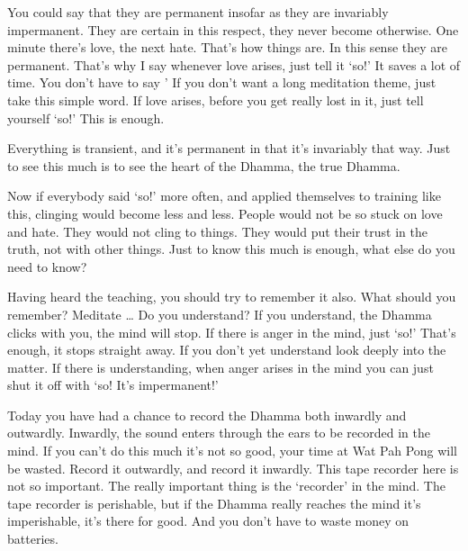 You could say that they are permanent insofar as they are invariably impermanent. They are certain in this respect, they never become otherwise. One minute there's love, the next hate. That's how things are. In this sense they are permanent. That's why I say whenever love arises, just tell it `so!' It saves a lot of time. You don't have to say   ' If you don't want a long meditation theme, just take this simple word. If love arises, before you get really lost in it, just tell yourself `so!' This is enough.

Everything is transient, and it's permanent in that it's invariably that way. Just to see this much is to see the heart of the Dhamma, the true Dhamma.

Now if everybody said `so!' more often, and applied themselves to training like this, clinging would become less and less. People would not be so stuck on love and hate. They would not cling to things. They would put their trust in the truth, not with other things. Just to know this much is enough, what else do you need to know?

Having heard the teaching, you should try to remember it also. What should you remember? Meditate \ldots{} Do you understand? If you understand, the Dhamma clicks with you, the mind will stop. If there is anger in the mind, just `so!' That's enough, it stops straight away. If you don't yet understand look deeply into the matter. If there is understanding, when anger arises in the mind you can just shut it off with `so! It's impermanent!'

Today you have had a chance to record the Dhamma both inwardly and outwardly. Inwardly, the sound enters through the ears to be recorded in the mind. If you can't do this much it's not so good, your time at Wat Pah Pong will be wasted. Record it outwardly, and record it inwardly. This tape recorder here is not so important. The really important thing is the `recorder' in the mind. The tape recorder is perishable, but if the Dhamma really reaches the mind it's imperishable, it's there for good. And you don't have to waste money on batteries.
